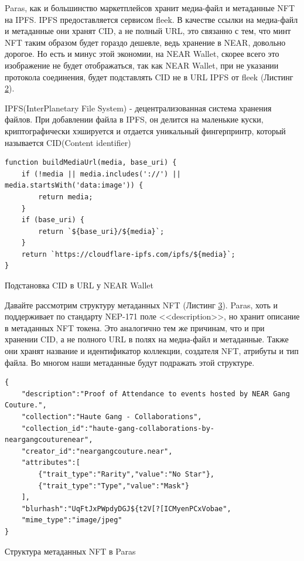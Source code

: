 Paras, как и большинство маркетплейсов хранит медиа-файл и метаданные NFT на IPFS\cite{ipfs}. IPFS предоставляется сервисом fleek\cite{fleek}. В качестве ссылки на медиа-файл и метаданные они хранят CID, а не полный URL, это связанно с тем, что минт NFT таким образом будет гораздо дешевле, ведь хранение в NEAR, довольно дорогое\cite{nearstoragestackinghowmuch}. Но есть и минус этой экономии, на NEAR Wallet, скорее всего это изображение не будет отображаться, так как NEAR Wallet, при не указании протокола соединения, будет подставлять CID не в URL IPFS от fleek (Листинг \hyperref[lst.pastecidnearwallet]{\color{blue} 2}).

\begin{definition}
    IPFS(InterPlanetary File System) - децентрализованная система хранения файлов. При добавлении файла в IPFS, он делится на маленькие куски, криптографически хэшируется и отдается уникальный фингерпринтр, который называется CID(Content identifier) \cite{ipfs}
\end{definition}

\begin{listing}[H]
\begin{verbatim}
function buildMediaUrl(media, base_uri) {
    if (!media || media.includes('://') || media.startsWith('data:image')) {
        return media;
    }
    if (base_uri) {
        return `${base_uri}/${media}`;
    }
    return `https://cloudflare-ipfs.com/ipfs/${media}`;
}
\end{verbatim}
\caption{Подстановка CID в URL у NEAR Wallet\cite{pastecidnearwallet}}
\label{lst.pastecidnearwallet}
\end{listing}

Давайте рассмотрим структуру метаданных NFT (Листинг \hyperref[lst.parasnftmetadatastruct]{\color{blue} 3}). Paras, хоть и поддерживает по стандарту NEP-171 поле <<description>>, но хранит описание в метаданных NFT токена. Это аналогично тем же причинам, что и при хранении CID, а не полного URL в полях на медиа-файл и метаданные. Также они хранят название и идентификатор коллекции, создателя NFT, атрибуты и тип файла. Во многом наши метаданные будут подражать этой структуре.

\begin{listing}[H]
\begin{verbatim}
{
    "description":"Proof of Attendance to events hosted by NEAR Gang Couture.",
    "collection":"Haute Gang - Collaborations",
    "collection_id":"haute-gang-collaborations-by-neargangcouturenear",
    "creator_id":"neargangcouture.near",
    "attributes":[
        {"trait_type":"Rarity","value":"No Star"},
        {"trait_type":"Type","value":"Mask"}
    ],
    "blurhash":"UqFtJxPWpdyDGJ${t2V[?[ICMyenPCxVobae",
    "mime_type":"image/jpeg"
}
\end{verbatim}
\caption{Структура метаданных NFT в Paras}
\label{lst.parasnftmetadatastruct}
\end{listing}


